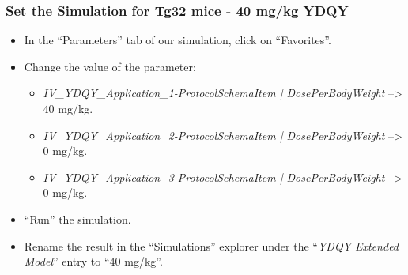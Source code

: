\documentclass[fleqn,10pt]{physiome}
\begin{document}
\subsubsection{Set the Simulation for Tg32 mice - 40 mg/kg YDQY}
\begin{itemize}
    \item In the ``Parameters'' tab of our simulation, click on ``Favorites''.
    \item Change the value of the parameter: 
    \begin{itemize}
        \item \textit{IV\_YDQY\_Application\_1-ProtocolSchemaItem | DosePerBodyWeight} --> $40$ mg/kg.
        \item \textit{IV\_YDQY\_Application\_2-ProtocolSchemaItem | DosePerBodyWeight} --> $0$ mg/kg.
        \item \textit{IV\_YDQY\_Application\_3-ProtocolSchemaItem | DosePerBodyWeight} --> $0$ mg/kg.
    \end{itemize}
    \item ``Run'' the simulation.
    \item Rename the result in the ``Simulations'' explorer under the ``\textit{YDQY Extended Model}'' entry to ``$40$ mg/kg''.
\end{itemize}
\end{document}
